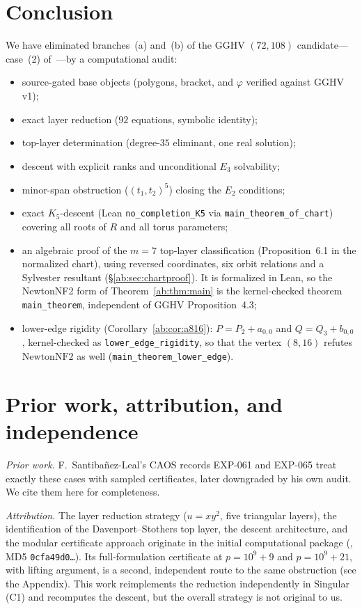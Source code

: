 \documentclass[a4paper,11pt]{article}
\newcommand{\filename}[1]{\texttt{\seqsplit{#1}}}
\theoremstyle{plain}
\theoremstyle{definition}
\theoremstyle{remark}
\begin{document}
\section{Conclusion}\label{ab:sec:conclusion}

We have eliminated branches~(a) and~(b) of the GGHV $(72,108)$ candidate---case~(2) of~\cite[Proposition~4.3]{GGHV}---by a computational audit:
\begin{itemize}[nosep]
\item source-gated base objects (polygons, bracket, and $\varphi$ verified against GGHV v1);
\item exact layer reduction ($92$ equations, symbolic identity);
\item top-layer determination (degree-$35$ eliminant, one real solution);
\item descent with explicit ranks and unconditional $E_3$ solvability;
\item minor-span obstruction ($(t_1,t_2)^5$) closing the $E_2$ conditions;
\item exact $K_5$-descent (Lean \texttt{no\_completion\_K5} via \texttt{main\_theorem\_of\_chart}) covering all roots of $R$ and all torus parameters;
\item an algebraic proof of the $m=7$ top-layer classification (Proposition~6.1 in the normalized chart), using reversed coordinates, six orbit relations and a Sylvester resultant (\S\ref{ab:sec:chartproof}). It is formalized in Lean, so the NewtonNF2 form of Theorem~\ref{ab:thm:main} is the kernel-checked theorem \texttt{main\_theorem}, independent of GGHV Proposition~4.3;
\item lower-edge rigidity (Corollary~\ref{ab:cor:a816}): $P=P_2+a_{0,0}$ and $Q=Q_3+b_{0,0}$, kernel-checked as \texttt{lower\_edge\_rigidity}, so that the vertex $(8,16)$ refutes $\mathrm{NewtonNF2}$ as well (\texttt{main\_theorem\_lower\_edge}).
\end{itemize}

\section{Prior work, attribution, and independence}\label{ab:sec:attribution}

\emph{Prior work.} F.~Santiba\~nez-Leal's CAOS records EXP-061 and EXP-065 treat exactly these cases with sampled certificates, later downgraded by his own audit. We cite them here for completeness.

\emph{Attribution.} The layer reduction strategy ($u=xy^2$, five triangular layers), the identification of the Davenport--Stothers top layer, the descent architecture, and the modular certificate approach originate in the initial computational package (\filename{branch\_ab\_elimination.zip}, MD5 \texttt{0cfa49d0\dots}). Its full-formulation certificate at $p=10^9+9$ and $p=10^9+21$, with lifting argument, is a second, independent route to the same obstruction (see the Appendix). This work reimplements the reduction independently in {\sc Singular} (C1) and recomputes the descent, but the overall strategy is not original to us.
\end{document}
